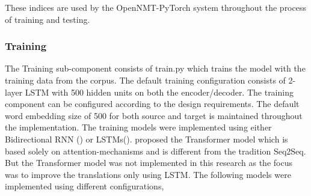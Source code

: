 These indices are used by the OpenNMT-PyTorch system throughout the process of training and testing. 
\subsubsection{Training}
The Training sub-component consists of train.py which trains the model with the training data from the corpus. The default training configuration consists of 2-layer LSTM with 500 hidden units on both the encoder/decoder. The training component can be configured according to the design requirements. The default word embedding size of 500 for both source and target is maintained throughout the implementation. The training models were implemented using either Bidirectional RNN (\cite{45610}) or LSTMs(\cite{NIPS2014_5346}). \cite{DBLP:journals/corr/VaswaniSPUJGKP17} proposed the Transformer model which is based solely on attention-mechanisms and is different from the tradition Seq2Seq. But the Transformer model was not implemented in this research as the focus was to improve the translations only using LSTM. The following models were implemented using different configurations,
